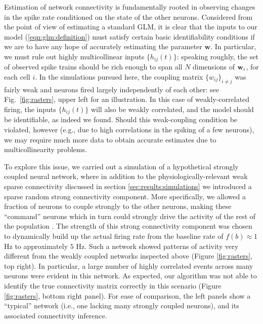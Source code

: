 \documentclass[aoas,preprint]{imsart}
\newcommand{\w}{w}
\newcommand{\bw}{\mathbf{\w}}
\begin{document}
Estimation of network connectivity is fundamentally rooted in
observing changes in the spike rate conditioned on the state of the
other neurons.  Considered from the point of view of estimating a
standard GLM, it is clear that the inputs to our model
(\ref{eqn:glm:definition}) must satisfy certain basic identifiability
conditions if we are to have any hope of accurately estimating the
parameter $\bw$.  In particular, we must rule out highly
multicollinear inputs $\{h_{ij}(t)\}$: speaking roughly, the set of
observed spike trains should be rich enough to span all $N$ dimensions
of ${\bf w}_i$, for each cell $i$.  In the simulations pursued here,
the coupling matrix $\{w_{ij}\}_{i \neq j}$ was fairly weak and
neurons fired largely independently of each other: see
Fig.~\ref{fig:rasters}, upper left for an illustration.  In this case
of weakly-correlated firing, the inputs $\{h_{ij}(t)\}$ will also be
weakly correlated, and the model should be identifiable, as indeed we
found.  Should this weak-coupling condition be violated, however
(e.g., due to high correlations in the spiking of a few neurons), we
may require much more data to obtain accurate estimates due to
multicollinearity problems.

To explore this issue, we carried out a simulation of a hypothetical
strongly coupled neural network, where in addition to the
physiologically-relevant weak sparse connectivity discussed in section
\ref{sec:results:simulations} we introduced a sparse random strong
connectivity component.  More specifically, we allowed a fraction of
neurons to couple strongly to the other neurons, making these
``command'' neurons which in turn could strongly drive the activity of
the rest of the population \cite{MACLEAN05}.  The strength of this
strong connectivity component was chosen to dynamically build up the
actual firing rate from the baseline rate of $f(b) \approx 1$ Hz to
approximately $5$ Hz. Such a network showed patterns of activity very
different from the weakly coupled networks inspected above (Figure
\ref{fig:rasters}, top right). In particular, a large number of highly
correlated events across many neurons were evident in this network. As
expected, our algorithm was not able to identify the true connectivity
matrix correctly in this scenario (Figure \ref{fig:rasters}, bottom
right panel).  For ease of comparison, the left panels show a
``typical'' network (i.e., one lacking many strongly coupled neurons),
and its associated connectivity inference.
\end{document}
